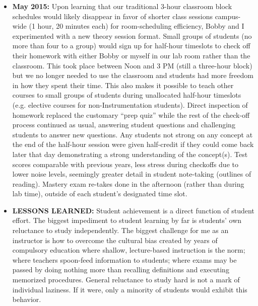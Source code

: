 \begin{itemize}
\item{} {\bf May 2015:} Upon learning that our traditional 3-hour classroom block schedules would likely disappear in favor of shorter class sessions campus-wide (1 hour, 20 minutes each) for room-scheduling efficiency, Bobby and I experimented with a new theory session format.  Small groups of students (no more than four to a group) would sign up for half-hour timeslots to check off their homework with either Bobby or myself in our lab room rather than the classroom.  This took place between Noon and 3 PM (still a three-hour block) but we no longer needed to use the classroom and students had more freedom in how they spent their time.  This also makes it possible to teach other courses to small groups of students during unallocated half-hour timeslots (e.g. elective courses for non-Instrumentation students).  Direct inspection of homework replaced the customary ``prep quiz'' while the rest of the check-off process continued as usual, answering student questions and challenging students to answer new questions.  Any students not strong on any concept at the end of the half-hour session were given half-credit if they could come back later that day demonstrating a strong understanding of the concept(s).  Test scores comparable with previous years, less stress during checkoffs due to lower noise levels, seemingly greater detail in student note-taking (outlines of reading).  Mastery exam re-takes done in the afternoon (rather than during lab time), outside of each student's designated time slot.
\vskip 10pt
\item{} {\bf LESSONS LEARNED:} Student achievement is a direct function of student effort.  The biggest impediment to student learning by far is students' own reluctance to study independently.  The biggest challenge for me as an instructor is how to overcome the cultural bias created by years of compulsory education where shallow, lecture-based instruction is the norm; where teachers spoon-feed information to students; where exams may be passed by doing nothing more than recalling definitions and executing memorized procedures.  General reluctance to study hard is not a mark of individual laziness.  If it were, only a minority of students would exhibit this behavior.
\end{itemize}







